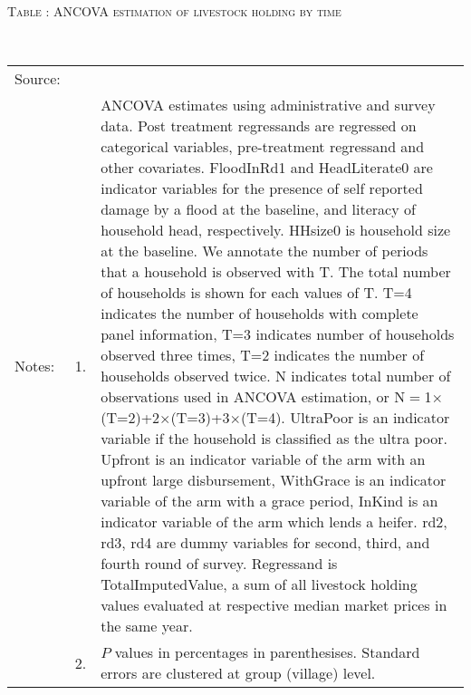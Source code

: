 \hspace{-1cm}\begin{minipage}[t]{14cm}
\hfil\textsc{\normalsize Table \thetable: ANCOVA estimation of livestock holding by time\label{tab ANCOVA livestock holding time varying}}\\
\setlength{\tabcolsep}{1pt}
\setlength{\baselineskip}{8pt}
\renewcommand{\arraystretch}{.55}
\hfil{}\\
\renewcommand{\arraystretch}{.8}
\setlength{\tabcolsep}{1pt}
\begin{tabular}{>{\hfill\scriptsize}p{1cm}<{}>{\hfill\scriptsize}p{.25cm}<{}>{\scriptsize}p{12cm}<{\hfill}}
Source:& \multicolumn{2}{l}{\scriptsize Estimated with GUK administrative and survey data.}\\
Notes: & 1. & ANCOVA estimates using administrative and survey data. Post treatment regressands are regressed on categorical variables, pre-treatment regressand and other covariates. \textsf{FloodInRd1} and \textsf{HeadLiterate0} are indicator variables for the presence of self reported damage by a flood at the baseline, and literacy of household head, respectively. \textsf{HHsize0} is household size at the baseline. We annotate the number of periods that a household is observed with \textsf{T}. The total number of households is shown for each values of \textsf{T}. \textsf{T=4} indicates the number of households with complete panel information, \textsf{T=3} indicates number of households observed three times, \textsf{T=2} indicates the number of households observed twice. \textsf{N} indicates total number of observations used in ANCOVA estimation, or \textsf{N$=$1$\times$(T=2)+2$\times$(T=3)+3$\times$(T=4)}.  \textsf{UltraPoor} is an indicator variable if the household is classified as the ultra poor. \textsf{Upfront} is an indicator variable of the arm with an upfront large disbursement, \textsf{WithGrace} is an indicator variable of the arm with a grace period, \textsf{InKind} is an indicator variable of the arm which lends a heifer. \textsf{rd2, rd3, rd4} are dummy variables for second, third, and fourth round of survey. Regressand is \textsf{TotalImputedValue}, a sum of all livestock holding values evaluated at respective median market prices in the same year. \\
& 2. & $P$ values in percentages in parenthesises. Standard errors are clustered at group (village) level.
\end{tabular}
\end{minipage}

